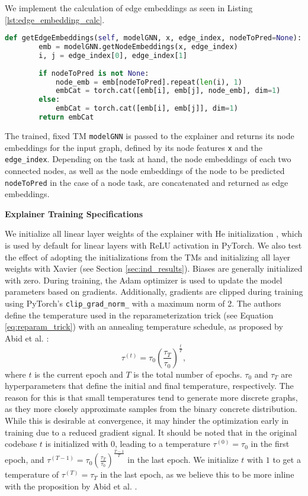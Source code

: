 We implement the calculation of edge embeddings as seen in Listing \ref{lst:edge_embedding_calc}.
\begin{lstlisting}[language=Python, caption=Implementation of edge embedding calculation., label=lst:edge_embedding_calc]
    def getEdgeEmbeddings(self, modelGNN, x, edge_index, nodeToPred=None):
        emb = modelGNN.getNodeEmbeddings(x, edge_index)
        i, j = edge_index[0], edge_index[1]
        
        if nodeToPred is not None:
            node_emb = emb[nodeToPred].repeat(len(i), 1)
            embCat = torch.cat([emb[i], emb[j], node_emb], dim=1)
        else:
            embCat = torch.cat([emb[i], emb[j]], dim=1)
        return embCat
\end{lstlisting}
The trained, fixed \ac{TM} \lstinline|modelGNN| is passed to the explainer and returns its node embeddings for the input graph, defined by its node features \lstinline|x| and the \lstinline|edge_index|. Depending on the task at hand, the node embeddings of each two connected nodes, as well as the node embeddings of the node to be predicted \lstinline|nodeToPred| in the case of a node task, are concatenated and returned as edge embeddings. \bigskip

\textbf{Explainer Training Specifications}\par
We initialize all linear layer weights of the explainer with He initialization \cite{he2015delving}, which is used by default for linear layers with ReLU activation in PyTorch. We also test the effect of adopting the initializations from the \acp{TM} and initializing all layer weights with Xavier \cite{glorot2010understanding} (see Section \ref{sec:ind_results}). Biases are generally initialized with zero. During training, the Adam \cite{kingma2014adam} optimizer is used to update the model parameters based on gradients. Additionally, gradients are clipped during training using PyTorch's \lstinline|clip_grad_norm_| with a maximum norm of 2. The authors define the temperature used in the reparameterization trick (see Equation \ref{eq:reparam_trick}) with an annealing temperature schedule, as proposed by Abid et al. \cite{abid2019concrete}:
\begin{equation}
    \tau^{(t)} = \tau_0(\frac{\tau_T}{\tau_0})^{\frac{t}{T}},
\end{equation} 
where $t$ is the current epoch and $T$ is the total number of epochs. $\tau_0$ and $\tau_T$ are hyperparameters that define the initial and final temperature, respectively.
The reason for this is that small temperatures tend to generate more discrete graphs, as they more closely approximate samples from the binary concrete distribution. While this is desirable at convergence, it may hinder the optimization early in training due to a reduced gradient signal. It should be noted that in the original codebase $t$ is initialized with $0$, leading to a temperature $\tau^{(0)} = \tau_0$ in the first epoch, and $\tau^{(T-1)} = \tau_0(\frac{\tau_T}{\tau_0})^{\frac{T-1}{T}}$ in the last epoch. We initialize $t$ with $1$ to get a temperature of $\tau^{(T)} = \tau_T$ in the last epoch, as we believe this to be more inline with the proposition by Abid et al. \cite{abid2019concrete}. \bigskip

